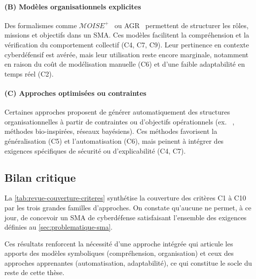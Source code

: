 \paragraph{(B) Modèles organisationnels explicites}

Des formalismes comme $\mathcal{M}OISE^+$~\cite{hubner2002moise} ou \ac{AGR}~\cite{Ferber2004} permettent de structurer les rôles, missions et objectifs dans un \ac{SMA}. Ces modèles facilitent la compréhension et la vérification du comportement collectif (C4, C7, C9). Leur pertinence en contexte cyberdéfensif est avérée, mais leur utilisation reste encore marginale, notamment en raison du coût de modélisation manuelle (C6) et d'une faible adaptabilité en temps réel (C2).

\paragraph{(C) Approches optimisées ou contraintes}

Certaines approches proposent de générer automatiquement des structures organisationnelles à partir de contraintes ou d'objectifs opérationnels (ex. ~\cite{modi2005adopt}, méthodes bio-inspirées, réseaux bayésiens). Ces méthodes favorisent la généralisation (C5) et l'automatisation (C6), mais peinent à intégrer des exigences spécifiques de sécurité ou d'explicabilité (C4, C7).

\subsection*{Bilan critique}

La \autoref{tab:revue-couverture-criteres} synthétise la couverture des critères C1 à C10 par les trois grandes familles d'approches. On constate qu'aucune ne permet, à ce jour, de concevoir un \ac{SMA} de cyberdéfense satisfaisant l'ensemble des exigences définies au \autoref{sec:problematique-sma}.



Ces résultats renforcent la nécessité d'une approche intégrée qui articule les apports des modèles symboliques (compréhension, organisation) et ceux des approches apprenantes (automatisation, adaptabilité), ce qui constitue le socle du reste de cette thèse.


